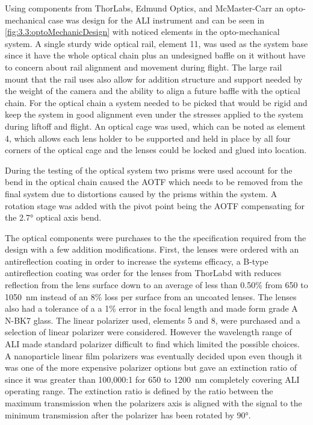 Using components from ThorLabs, Edmund Optics, and McMaster-Carr an opto-mechanical case was design for the ALI instrument and can be seen in \autoref{fig:3.3:optoMechanicDesign} with noticed elements in the opto-mechanical system. A single sturdy wide optical rail, element 11, was used as the system base since it have the whole optical chain plus an undesigned baffle on it without have to concern about rail alignment and movement during flight. The large rail mount that the rail uses also allow for addition structure and support needed by the weight of the camera and the ability to align a future baffle with the optical chain. For the optical chain a system needed to be picked that would be rigid and keep the system in good alignment even under the stresses applied to the system during liftoff and flight. An optical cage was used, which can be noted as element 4, which allows each lens holder to be supported and held in place by all four corners of the optical cage and the lenses could be locked and glued into location.

During the testing of the optical system two prisms were used account for the bend in the optical chain caused the AOTF which needs to be removed from the final system due to distortions caused by the prisms within the system. A rotation stage was added with the pivot point being the AOTF compensating for the 2.7\si{\degree} optical axis bend.

The optical components were purchases to the the specification required from the design with a few addition modifications. First, the lenses were ordered with an antireflection coating in order to increase the systems efficacy, a B-type antireflection coating was order for the lenses from ThorLabd with reduces reflection from the lens surface down to an average of less than 0.50\% from 650 to 1050~nm instead of an 8\% loss per surface from an uncoated lenses. The lenses also had a tolerance of a a 1\% error in the focal length and made form grade A N-BK7 glass. The linear polarizer used, elements 5 and 8, were purchased and a selection of linear polarizer were considered. However the wavelength range of ALI made standard polarizer difficult to find which limited the possible choices. A nanoparticle linear film polarizers was eventually decided upon even though it was one of the more expensive polarizer options but gave an extinction ratio of since it was greater than 100,000:1 for 650 to 1200~nm completely covering ALI operating range. The extinction ratio is defined by the ratio between the maximum transmission when the polarizers axis is aligned with the signal to the minimum transmission after the polarizer has been rotated by 90\si{\degree}.

